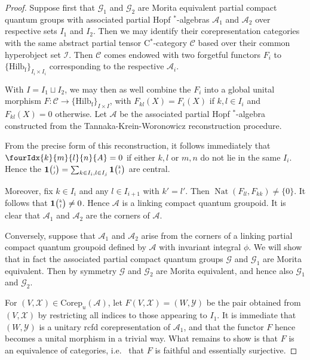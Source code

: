\documentclass[11pt]{article}
\DeclareMathOperator{\fin}{\mathrm{f}}
\DeclareMathOperator{\Nat}{\mathrm{Nat}}
\newcommand{\Corep}{\mathrm{Corep}}
\newcommand{\CatCC}{\mathscr{C}}
\newcommand{\Hilb}{\mathrm{Hilb}}
\newcommand{\Grt}[3]{#1{\tiny {\begin{pmatrix} #2\\#3\end{pmatrix}}}}
\newcommand{\UnitC}[2]{\Grt{\mathbf{1}}{#1}{#2}}
\newcommand{\Gr}[5]{\fourIdx{#2}{#4}{#3}{#5}{#1}}%
\theoremstyle{definition}
\numberwithin{equation}{section}
\begin{document}
\begin{proof} Suppose first that $\mathscr{G}_1$ and $\mathscr{G}_2$ are Morita equivalent partial compact quantum groups with associated partial Hopf $^*$-algebras $\mathscr{A}_1$ and $\mathscr{A}_2$ over respective sets $I_1$ and $I_2$. Then we may identify their corepresentation categories with the same abstract partial tensor C$^*$-category $\CatCC$ based over their common hyperobject set $\mathscr{I}$. Then $\CatCC$ comes endowed with two forgetful functors $F_i$ to $\{\Hilb_{\fin}\}_{I_i\times I_i}$ corresponding to the respective $\mathscr{A}_i$.

With $I = I_1\sqcup I_2$, we may then as well combine the $F_i$ into a global unital morphism $F:\CatCC \rightarrow \{\Hilb_{\fin}\}_{I\times I}$, with $F_{kl}(X)=F_i(X)$ if $k,l\in I_i$ and $F_{kl}(X)=0$ otherwise. Let $\mathscr{A}$ be the associated partial Hopf $^*$-algebra constructed from the Tannaka-Krein-Woronowicz reconstruction procedure. 

From the precise form of this reconstruction, it follows immediately that $\Gr{A}{k}{l}{m}{n} =0$ if either $k,l$ or $m,n$ do not lie in the same $I_i$. Hence the $\UnitC{i}{j} = \sum_{k\in I_i,l\in I_j} \UnitC{k}{l}$ are central. 

Moreover, fix $k\in I_i$ and any $l\in I_{i+1}$ with $k'=l'$. Then $\Nat(F_{ll},F_{kk})\neq \{0\}$. It follows that $\UnitC{k}{l}\neq 0$. Hence $\mathscr{A}$ is a linking compact quantum groupoid. It is clear that $\mathscr{A}_1$ and $\mathscr{A}_2$ are the corners of $\mathscr{A}$. 

Conversely, suppose that $\mathscr{A}_1$ and $\mathscr{A}_2$ arise from the corners of a linking partial compact quantum groupoid defined by $\mathscr{A}$ with invariant integral $\phi$. We will show that in fact the associated partial compact quantum groups $\mathscr{G}$ and $\mathscr{G}_1$ are Morita equivalent. Then by symmetry $\mathscr{G}$ and $\mathscr{G}_2$ are Morita equivalent, and hence also $\mathscr{G}_1$ and $\mathscr{G}_2$.

For $(V,\mathscr{X}) \in \Corep_u(\mathscr{A})$, let $F(V,\mathscr{X}) = (W,\mathscr{Y})$ be the pair obtained from $(V,\mathscr{X})$ by restricting all indices to those appearing to $I_1$. It is immediate that $(W,\mathscr{Y})$ is a unitary rcfd corepresentation of $\mathscr{A}_1$, and that the functor $F$ hence becomes a unital morphism in a trivial way. What remains to show is that $F$ is an equivalence of categories, i.e.~ that $F$ is faithful and essentially surjective. 


\end{proof}
\end{document}
